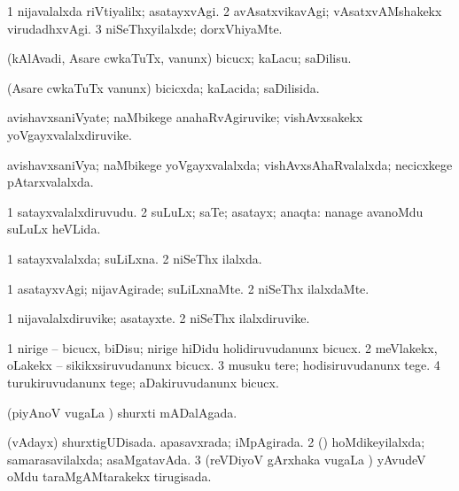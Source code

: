 \bentry
{} 
\gl{\kirxvi}
\bmng
\bnum
\num{1} nijavalalxda riVtiyalilx; asatayxvAgi. 
\num{2} avAsatxvikavAgi; vAsatxvAMshakekx virudadhxvAgi. 
\num{3} niSeThxyilalxde; dorxVhiyaMte. 
\enum
\emng
\eentry

\bentry
{} 
\gl{\sakirx}
\expl{}
\bmng
(kAlAvadi, Asare cwkaTuTx, \mo vanunx) bicucx; kaLacu; saDilisu. 
\emng
\eentry

\bentry
{} 
\gl{\gu}
\expl{}
\bmng
(Asare cwkaTuTx \mo vanunx) bicicxda; kaLacida; saDilisida. 
\emng
\eentry

\bentry
{} 
\gl{\nA}
\expl{}
\bmng
avishavxsaniVyate; naMbikege anahaRvAgiruvike; vishAvxsakekx yoVgayxvalalxdiruvike. 
\emng
\eentry

\bentry
{} 
\gl{\gu}
\expl{}
\bmng
avishavxsaniVya; naMbikege yoVgayxvalalxda; vishAvxsAhaRvalalxda; necicxkege pAtarxvalalxda. 
\emng
\eentry

\bentry
{} 
\gl{\nA}
\bmng
\bnum
\num{1} satayxvalalxdiruvudu. 
\num{2} suLuLx; saTe; asatayx; anaqta:  nanage avanoMdu suLuLx heVLida. 
\enum
\emng
\eentry

\bentry
{} 
\gl{\gu}
\expl{}
\bmng
\bnum
\num{1} satayxvalalxda; suLiLxna. 
\num{2} niSeThx ilalxda. 
\enum
\emng
\eentry

\bentry
{} 
\gl{\kirxvi}
\expl{}
\bmng
\bnum
\num{1} asatayxvAgi; nijavAgirade; suLiLxnaMte. 
\num{2} niSeThx ilalxdaMte. 
\enum
\emng
\eentry

\bentry
{} 
\gl{\nA}
\expl{}
\bmng
\bnum
\num{1} nijavalalxdiruvike; asatayxte. 
\num{2} niSeThx ilalxdiruvike. 
\enum
\emng
\eentry

\bentry
{} 
\gl{\sakirx}
\expl{}
\bmng
\bnum
\num{1} nirige -- bicucx, biDisu; nirige hiDidu holidiruvudanunx bicucx. 
\num{2} meVlakekx, oLakekx -- sikikxsiruvudanunx bicucx. 
\num{3} musuku tere; hodisiruvudanunx tege. 
\num{4} turukiruvudanunx tege; aDakiruvudanunx bicucx. 
\enum
\emng
\eentry

\bentry
{} 
\gl{\gu}
\expl{}
\bmng
(piyAnoV \mo vugaLa \vi) shurxti mADalAgada. 
\emng
\eentry

\bentry
{} 
\gl{\gu}
\expl{}
\bmng
\bnum
{} (vAdayx) 
\banum
{} shurxtigUDisada. 
 apasavxrada; iMpAgirada. 
\eanum
\numie
\num{2} (\rUpa) hoMdikeyilalxda; samarasavilalxda; asaMgatavAda. 
\num{3} (reVDiyoV gArxhaka \mo vugaLa \vi) yAvudeV oMdu taraMgAMtarakekx tirugisada. 
\enum
\emng
\eentry

